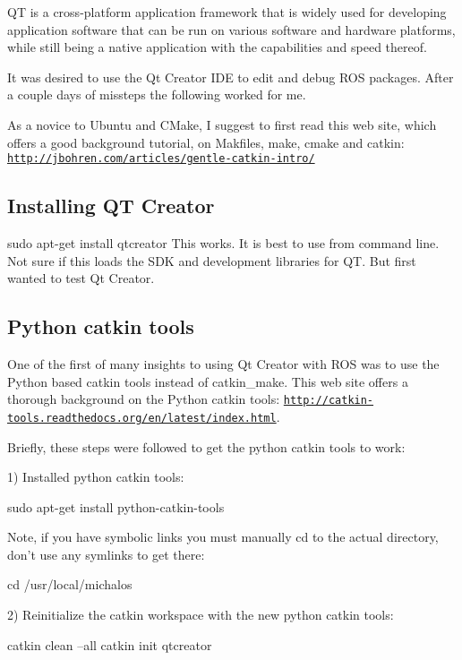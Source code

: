Q\-T is a cross-\/platform application framework that is widely used for developing application software that can be run on various software and hardware platforms, while still being a native application with the capabilities and speed thereof.

It was desired to use the Qt Creator I\-D\-E to edit and debug R\-O\-S packages. After a couple days of missteps the following worked for me.

As a novice to Ubuntu and C\-Make, I suggest to first read this web site, which offers a good background tutorial, on Makfiles, make, cmake and catkin\-: \href{http://jbohren.com/articles/gentle-catkin-intro/}{\tt http\-://jbohren.\-com/articles/gentle-\/catkin-\/intro/}

\subsection*{Installing Q\-T Creator }

sudo apt-\/get install qtcreator This works. It is best to use from command line. Not sure if this loads the S\-D\-K and development libraries for Q\-T. But first wanted to test Qt Creator.

\subsection*{Python catkin tools }

One of the first of many insights to using Qt Creator with R\-O\-S was to use the Python based catkin tools instead of catkin\-\_\-make. This web site offers a thorough background on the Python catkin tools\-: \href{http://catkin-tools.readthedocs.org/en/latest/index.html}{\tt http\-://catkin-\/tools.\-readthedocs.\-org/en/latest/index.\-html}.

Briefly, these steps were followed to get the python catkin tools to work\-:

1) Installed python catkin tools\-: \begin{DoxyVerb}sudo apt-get install python-catkin-tools
\end{DoxyVerb}


Note, if you have symbolic links you must manually cd to the actual directory, don't use any symlinks to get there\-: \begin{DoxyVerb}cd /usr/local/michalos
\end{DoxyVerb}


2) Reinitialize the catkin workspace with the new python catkin tools\-: \begin{DoxyVerb}catkin clean --all
catkin init
qtcreator
\end{DoxyVerb}


